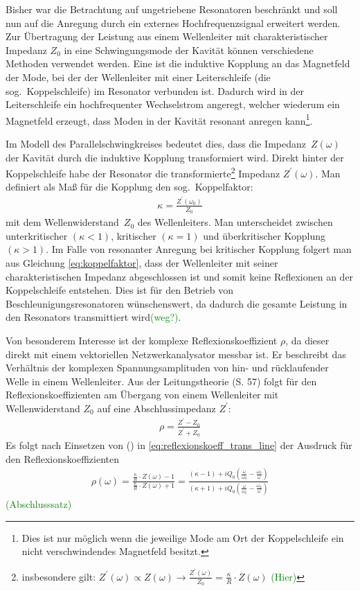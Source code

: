 \documentclass[11pt, a4paper]{scrbook}
\newcommand{\todo}[1]{{\textcolor{Green}{(#1)}}}
\begin{document}
	Bisher war die Betrachtung auf ungetriebene Resonatoren beschränkt und soll nun auf die Anregung durch ein externes Hochfrequenzsignal erweitert werden.
	Zur Übertragung der Leistung aus einem Wellenleiter mit charakteristischer Impedanz $Z_0$ in eine Schwingungsmode der Kavität können verschiedene Methoden verwendet werden.
	Eine ist die induktive Kopplung an das Magnetfeld der Mode, bei der der Wellenleiter mit einer Leiterschleife (die sog.\ Koppelschleife) im Resonator verbunden ist.
	Dadurch wird in der Leiterschleife ein hochfrequenter Wechselstrom angeregt, welcher wiederum ein Magnetfeld erzeugt, dass Moden in der Kavität resonant anregen kann\footnote{Dies ist nur möglich wenn die jeweilige Mode am Ort der Koppelschleife ein nicht verschwindendes Magnetfeld besitzt.}.
	
	Im Modell des Parallelschwingkreises bedeutet dies, dass die Impedanz~$Z(\omega)$ der Kavität durch die induktive Kopplung transformiert wird.
	Direkt hinter der Koppelschleife habe der Resonator die transformierte\footnote{insbesondere gilt: $Z^\prime(\omega) \propto Z(\omega) \longrightarrow \frac{Z^\prime(\omega)}{Z_0} = \frac{\kappa}{R} \cdot Z(\omega)$ \todo{Hier}} Impedanz $Z^\prime(\omega)$.
	Man definiert als Maß für die Kopplung den sog.\ Koppelfaktor:
	\begin{align}
		\kappa = \frac{Z^\prime(\omega_0)}{Z_0}
		\label{eq:koppelfaktor}
	\end{align}
	mit dem Wellenwiderstand~$Z_0$ des Wellenleiters.
	Man unterscheidet zwischen unterkritischer $(\kappa < 1)$, kritischer $(\kappa = 1)$ und überkritischer Kopplung $(\kappa > 1)$.
	Im Falle von resonanter Anregung bei kritischer Kopplung folgert man aus Gleichung \eqref{eq:koppelfaktor}, dass der Wellenleiter mit seiner charakteristischen Impedanz abgeschlossen ist und somit keine Reflexionen an der Koppelschleife entstehen.
	Dies ist für den Betrieb von Beschleunigungsresonatoren wünschenswert, da dadurch die gesamte Leistung in den Resonators transmittiert wird\todo{weg?}.
	
	Von besonderem Interesse ist der komplexe Reflexionskoeffizient $\rho$, da dieser direkt mit einem vektoriellen Netzwerkanalysator messbar ist.
	Er beschreibt das Verhältnis der komplexen Spannungsamplituden von hin- und rücklaufender Welle in einem Wellenleiter.
	Aus der Leitungstheorie \cite{pozar} (S. 57) folgt für den Reflexionskoeffizienten am Übergang von einem Wellenleiter mit Wellenwiderstand $Z_0$ auf eine Abschlussimpedanz $Z^\prime$:
	\begin{align}
		\rho = \frac{Z^\prime - Z_0}{Z^\prime + Z_0}
		\label{eq:reflexionskoeff_trans_line}
	\end{align}
	Es folgt nach Einsetzen von () in \eqref{eq:reflexionskoeff_trans_line} der Ausdruck für den Reflexionskoeffizienten 
	\begin{align}
		\rho(\omega) = \frac{\frac{\kappa}{R} \cdot Z(\omega) - 1}{\frac{\kappa}{R} \cdot Z(\omega) + 1} = \frac{(\kappa - 1) + i  Q_0 \left( \frac{\omega}{\omega_0}  - \frac{\omega_0}{\omega}\right)}{\left( \kappa + 1 \right) + i  Q_0 \left( \frac{\omega}{\omega_0}  - \frac{\omega_0}{\omega}\right)}
	\end{align}
	\todo{Abschlusssatz}
\end{document}

